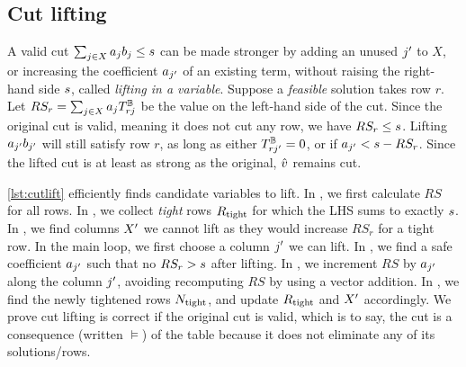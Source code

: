 \documentclass[a4paper,UKenglish,cleveref,autoref,thm-restate]{lipics-v2021}
\begin{document}
\subsection{Cut lifting}
\label{sec:cuts:cutlift}
A valid cut $\sum_{j \in X} a_j b_j \leq s$ can be made stronger by adding an unused $j'$ to $X$, or increasing the coefficient $a_{j'}$ of an existing term, without raising the right-hand side $s$, called \textit{lifting in a variable}.
Suppose a \textit{feasible} solution takes row $r$.
Let $RS_r = \sum_{j \in X}{a_{j} T^{\mathbb{B}}_{rj}}$ be the value on the left-hand side of the cut.
Since the original cut is valid, meaning it does not cut any row, we have $RS_r \leq s$.
Lifting $a_{j'} b_{j'}$ will still satisfy row $r$, as long as either $T^{\mathbb{B}}_{rj'} = 0$, or if $a_{j'} < s - RS_r$.
Since the lifted cut is at least as strong as the original, $\hat{v}$ remains cut.

\cref{lst:cutlift} efficiently finds candidate variables to lift.
In , we first calculate $RS$ for all rows.
In , we collect \textit{tight} rows $R_{\text{tight}}$ for which the LHS sums to exactly $s$.
In , we find columns $X'$ we cannot lift as they would increase $RS_r$ for a tight row.
In the main loop, we first choose a column $j'$ we can lift.
In , we find a safe coefficient $a_{j'}$ such that no $RS_r > s$ after lifting.
In , we increment $RS$ by $a_{j'}$ along the column $j'$, avoiding recomputing $RS$ by using a vector addition.
In , we find the newly tightened rows $N_{\text{tight}}$, and update $R_{\text{tight}}$ and $X'$ accordingly.
We prove cut lifting is correct if the original cut is valid, which is to say, the cut is a consequence (written $\models$) of the table because it does not eliminate any of its solutions/rows.

\begin{theorem}
\cutliftThm
\end{theorem}
\end{document}
